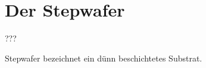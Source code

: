 
\section{Der Stepwafer}
\label{sec:stepwafer}

???

Stepwafer bezeichnet ein dünn beschichtetes Substrat.